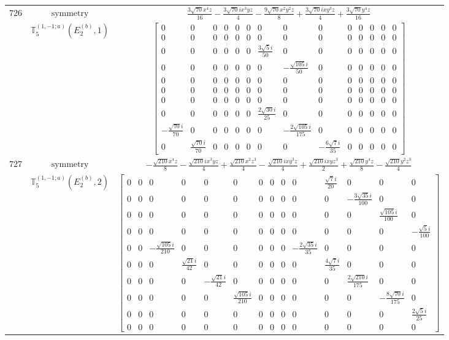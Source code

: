 \documentclass[fleqn,8pt,landscape]{jsarticle}
\begin{document}
\begin{longtable}{ccc}
$ 726 $ & $ \text{symmetry} $ & $ \frac{3 \sqrt{70} x^{4} z}{16} - \frac{3 \sqrt{70} i x^{3} y z}{4} - \frac{9 \sqrt{70} x^{2} y^{2} z}{8} + \frac{3 \sqrt{70} i x y^{3} z}{4} + \frac{3 \sqrt{70} y^{4} z}{16} $ \\
$  $ & $ \mathbb{T}_{5}^{(1,-1;a)}(E_{2}^{(b)},1) $ & $ \begin{bmatrix} 0 & 0 & 0 & 0 & 0 & 0 & 0 & 0 & 0 & 0 & 0 & 0 & 0 & 0 \\ 0 & 0 & 0 & 0 & 0 & 0 & 0 & 0 & 0 & 0 & 0 & 0 & 0 & 0 \\ 0 & 0 & 0 & 0 & 0 & 0 & \frac{3 \sqrt{5} i}{50} & 0 & 0 & 0 & 0 & 0 & 0 & 0 \\ 0 & 0 & 0 & 0 & 0 & 0 & 0 & - \frac{\sqrt{105} i}{50} & 0 & 0 & 0 & 0 & 0 & 0 \\ 0 & 0 & 0 & 0 & 0 & 0 & 0 & 0 & 0 & 0 & 0 & 0 & 0 & 0 \\ 0 & 0 & 0 & 0 & 0 & 0 & 0 & 0 & 0 & 0 & 0 & 0 & 0 & 0 \\ 0 & 0 & 0 & 0 & 0 & 0 & 0 & 0 & 0 & 0 & 0 & 0 & 0 & 0 \\ 0 & 0 & 0 & 0 & 0 & 0 & \frac{2 \sqrt{30} i}{25} & 0 & 0 & 0 & 0 & 0 & 0 & 0 \\ - \frac{\sqrt{70} i}{70} & 0 & 0 & 0 & 0 & 0 & 0 & - \frac{2 \sqrt{105} i}{175} & 0 & 0 & 0 & 0 & 0 & 0 \\ 0 & \frac{\sqrt{70} i}{70} & 0 & 0 & 0 & 0 & 0 & 0 & - \frac{6 \sqrt{7} i}{35} & 0 & 0 & 0 & 0 & 0 \end{bmatrix} $ \\ \hline
$ 727 $ & $ \text{symmetry} $ & $ - \frac{\sqrt{210} x^{4} z}{8} - \frac{\sqrt{210} i x^{3} y z}{4} + \frac{\sqrt{210} x^{2} z^{3}}{4} - \frac{\sqrt{210} i x y^{3} z}{4} + \frac{\sqrt{210} i x y z^{3}}{2} + \frac{\sqrt{210} y^{4} z}{8} - \frac{\sqrt{210} y^{2} z^{3}}{4} $ \\
$  $ & $ \mathbb{T}_{5}^{(1,-1;a)}(E_{2}^{(b)},2) $ & $ \begin{bmatrix} 0 & 0 & 0 & 0 & 0 & 0 & 0 & 0 & 0 & 0 & \frac{\sqrt{7} i}{20} & 0 & 0 & 0 \\ 0 & 0 & 0 & 0 & 0 & 0 & 0 & 0 & 0 & 0 & 0 & - \frac{3 \sqrt{35} i}{100} & 0 & 0 \\ 0 & 0 & 0 & 0 & 0 & 0 & 0 & 0 & 0 & 0 & 0 & 0 & \frac{\sqrt{105} i}{100} & 0 \\ 0 & 0 & 0 & 0 & 0 & 0 & 0 & 0 & 0 & 0 & 0 & 0 & 0 & - \frac{\sqrt{5} i}{100} \\ 0 & 0 & - \frac{\sqrt{105} i}{210} & 0 & 0 & 0 & 0 & 0 & 0 & - \frac{2 \sqrt{35} i}{35} & 0 & 0 & 0 & 0 \\ 0 & 0 & 0 & \frac{\sqrt{21} i}{42} & 0 & 0 & 0 & 0 & 0 & 0 & \frac{4 \sqrt{7} i}{35} & 0 & 0 & 0 \\ 0 & 0 & 0 & 0 & - \frac{\sqrt{21} i}{42} & 0 & 0 & 0 & 0 & 0 & 0 & \frac{2 \sqrt{210} i}{175} & 0 & 0 \\ 0 & 0 & 0 & 0 & 0 & \frac{\sqrt{105} i}{210} & 0 & 0 & 0 & 0 & 0 & 0 & - \frac{8 \sqrt{70} i}{175} & 0 \\ 0 & 0 & 0 & 0 & 0 & 0 & 0 & 0 & 0 & 0 & 0 & 0 & 0 & \frac{2 \sqrt{5} i}{25} \\ 0 & 0 & 0 & 0 & 0 & 0 & 0 & 0 & 0 & 0 & 0 & 0 & 0 & 0 \end{bmatrix} $ \\ \hline

\end{longtable}
\end{document}
